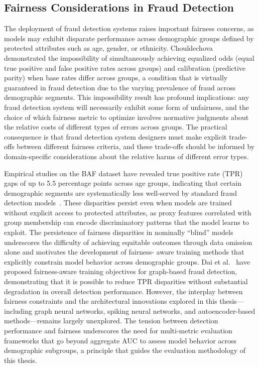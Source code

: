 \subsection{Fairness Considerations in Fraud Detection}

The deployment of fraud detection systems raises important fairness concerns, as
models may exhibit disparate performance across demographic groups defined by
protected attributes such as age, gender, or ethnicity.
Chouldechova~\cite{chouldechova2017fair} demonstrated the impossibility of
simultaneously achieving equalized odds (equal true positive and false positive
rates across groups) and calibration (predictive parity) when base rates differ
across groups, a condition that is virtually guaranteed in fraud detection due
to the varying prevalence of fraud across demographic segments. This
impossibility result has profound implications: any fraud detection system will
necessarily exhibit some form of unfairness, and the choice of which fairness
metric to optimize involves normative judgments about the relative costs of
different types of errors across groups. The practical consequence is that fraud
detection system designers must make explicit trade-offs between different
fairness criteria, and these trade-offs should be informed by domain-specific
considerations about the relative harms of different error types.

Empirical studies on the BAF dataset have revealed true positive rate (TPR) gaps
of up to 5.5 percentage points across age groups, indicating that certain
demographic segments are systematically less well-served by standard fraud
detection models~\cite{kozodoi2022fairness}. These disparities persist even when
models are trained without explicit access to protected attributes, as proxy
features correlated with group membership can encode discriminatory patterns
that the model learns to exploit. The persistence of fairness disparities in
nominally ``blind'' models underscores the difficulty of achieving equitable
outcomes through data omission alone and motivates the development of fairness-
aware training methods that explicitly constrain model behavior across
demographic groups. Dai et al.~\cite{dai2021fair} have proposed fairness-aware
training objectives for graph-based fraud detection, demonstrating that it is
possible to reduce TPR disparities without substantial degradation in overall
detection performance. However, the interplay between fairness constraints and
the architectural innovations explored in this thesis---including graph neural
networks, spiking neural networks, and autoencoder-based methods---remains
largely unexplored. The tension between detection performance and fairness
underscores the need for multi-metric evaluation frameworks that go beyond
aggregate AUC to assess model behavior across demographic subgroups, a principle
that guides the evaluation methodology of this thesis.

